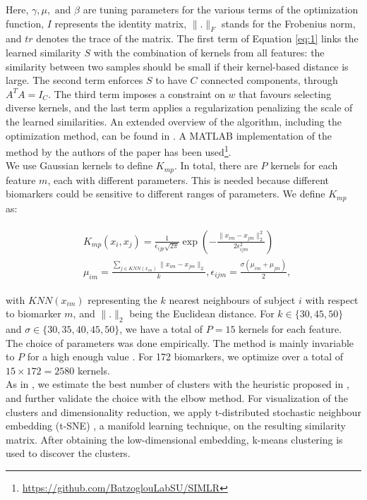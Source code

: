 Here, $\gamma, \mu, \text{ and } \beta$ are tuning parameters for the various terms of the optimization function, $I$ represents the identity matrix, $\| . \|_F$ stands for the Frobenius norm, and $tr$ denotes the trace of the matrix. The first term of Equation \ref{eq:1} links the learned similarity $S$ with the combination of kernels from all features: the similarity between two samples should be small if their kernel-based distance is large. The second term enforces $S$ to have $C$ connected components, through $A^TA = I_C$. The third term imposes a constraint on $w$ that favours selecting diverse kernels, and the last term applies a regularization penalizing the scale of the learned similarities. An extended overview of the algorithm, including the optimization method, can be found in \cite{Ramazzotti2018}. A MATLAB implementation of the method by the authors of the paper has been used\footnote{\url{https://github.com/BatzoglouLabSU/SIMLR}}. \\

We use Gaussian kernels to define $K_{mp}$. In total, there are $P$ kernels for each feature $m$, each with different parameters. This is needed because different biomarkers could be sensitive to different ranges of parameters. We define $K_{mp}$ as:

\begin{align}
\begin{split}\label{eq:2}
{}&K_{mp}(x_i,x_j) = \frac{1}{\epsilon_{ijp}\sqrt{2\pi}} \exp \left( -\frac{\| x_{im} - x_{jm} \|^2_2}{2\epsilon_{ijm}^2}  \right) \\
{}&\mu_{im} = \frac{\sum_{j \in KNN(x_{im})} \| x_{im} - x_{jm} \|_2}{k}, \epsilon_{ijm}=\frac{\sigma(\mu_{im} + \mu_{jm})}{2},
\end{split}
\end{align}

with $KNN(x_{im})$ representing the $k$ nearest neighbours of subject $i$ with respect to biomarker $m$, and $\| .\|_2$ being the Euclidean distance. For $k\in \{30,45,50\}$ and $\sigma \in \{30,35,40,45,50\}$, we have a total of $P=15$ kernels for each feature. The choice of parameters was done empirically. The method is mainly invariable to $P$ for a high enough value \cite{Wang2017a}. For 172 biomarkers, we optimize over a total of $15\times 172=2580$ kernels. \\

As in \cite{Ramazzotti2018}, we estimate the best number of clusters with the heuristic proposed in \cite{Zelnik-Manor}, and further validate the choice with the elbow method. For visualization of the clusters and dimensionality reduction, we apply t-distributed stochastic neighbour embedding (t-SNE) \cite{VanDerMaaten2008}, a manifold learning technique, on the resulting similarity matrix. After obtaining the low-dimensional embedding, k-means clustering is used to discover the clusters. \\

